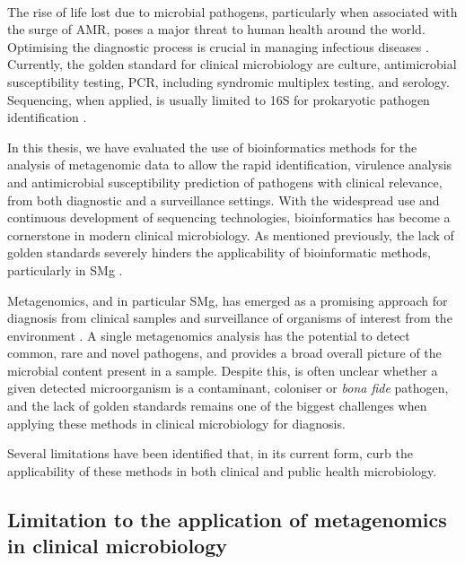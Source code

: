 \mbox{}\\
\vspace{8cm}

The rise of life lost due to microbial pathogens, particularly when associated with the surge of \ac{AMR}, poses a major threat to human health around the world. Optimising the diagnostic process is crucial in managing infectious diseases \citep{vos_global_2020}. Currently, the golden standard for clinical microbiology are culture, antimicrobial susceptibility testing, \ac{PCR}, including syndromic multiplex testing, and serology. Sequencing, when applied, is usually limited to 16S for prokaryotic pathogen identification \citep{greninger_challenge_2018}. 

In this thesis, we have evaluated the use of bioinformatics methods for the analysis of metagenomic data to allow the rapid identification, virulence analysis and antimicrobial susceptibility prediction of pathogens with clinical relevance, from both diagnostic and a surveillance settings. With the widespread use and continuous development of sequencing technologies, bioinformatics has become a cornerstone in modern clinical microbiology. As mentioned previously, the lack of golden standards severely hinders the applicability of bioinformatic methods, particularly in \ac{SMg} \citep{carrico_primer_2018, couto_critical_2018, angers-loustau_challenges_2018, gruening_recommendations_2019, sczyrba_critical_2017}. 

Metagenomics, and in particular \ac{SMg}, has emerged as a promising approach for diagnosis from clinical samples and surveillance of organisms of interest from the environment \citep{loman_culture-independent_2013, rossen__2018, schuele_future_2021, chiu_clinical_2019}. A single metagenomics analysis has the potential to detect common, rare and novel pathogens, and provides a broad overall picture of the microbial content present in a sample. Despite this, is often unclear whether a given detected microorganism is a contaminant, coloniser or \textit{bona fide} pathogen, and the lack of golden standards remains one of the biggest challenges when applying these methods in clinical microbiology for diagnosis. 

Several limitations have been identified that, in its current form, curb the applicability of these methods in both clinical and public health microbiology. 

\subsection{Limitation to the application of metagenomics in clinical microbiology}

